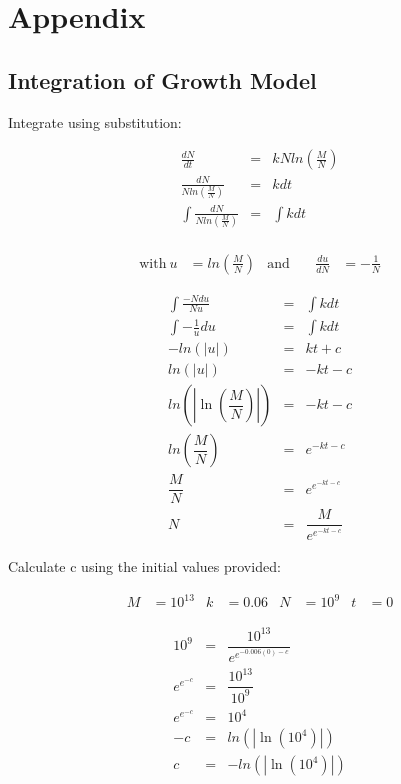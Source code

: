 \chapter{Appendix}

\section{Integration of Growth Model} \label{sec:substitution}

Integrate using substitution:

\begin{eqnarray*}
\frac{dN}{dt}                                &=& kNln\left(\frac{M}{N} \right) \\
\frac{dN}{Nln\left(\frac{M}{N} \right)}      &=& kdt \\
\int \frac{dN}{Nln\left(\frac{M}{N} \right)} &=& \int kdt \\
\end{eqnarray*}

\begin{align*}
\text{with}\ u &= ln\left(\frac{M}{N} \right) & \text{and}\ && \frac{du}{dN} &= -\frac{1}{N}
\end{align*}

\begin{eqnarray*}
\int \frac{-Ndu}{Nu} &=& \int kdt \\
\int -\frac{1}{u}du &=& \int kdt \\
-ln\left(|{u}| \right) &=& kt + c \\
ln\left(|{u}| \right) &=& -kt - c \\
ln\left(\left|\ln\left(\dfrac{M}{N}\right)\right|\right) &=& -kt - c \\
ln\left(\dfrac{M}{N}\right) &=& e^{-kt - c} \\
\dfrac{M}{N}                &=& e^{e^{-kt - c}} \\
N                           &=& \dfrac{M}{e^{e^{-kt - c}}}
\end{eqnarray*}


\clearpage

Calculate c using the initial values provided:

\begin{align*}
    M &= 10^{13} & k &= 0.06 & N &= 10^9 & t &= 0
\end{align*}

\begin{eqnarray*}
10^9        &=& \dfrac{10^{13}}{e^{e^{-0.006(0) - c}}} \\
e^{e^{-c}}  &=& \dfrac{10^{13}}{10^9} \\
e^{e^{-c}}  &=& {10^4} \\
-c          &=& ln\left(\left|\ln\left({10^4}\right)\right|\right) \\
c           &=& -ln\left(\left|\ln\left({10^4}\right)\right|\right) \\
\end{eqnarray*}

